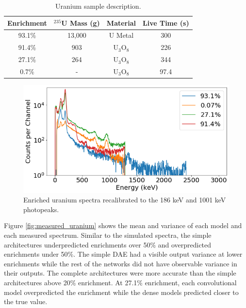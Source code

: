 \begin{table}[H]
\centering
\caption{Uranium sample description.}
\label{table:default_sim_params_uranium}
\begin{tabular}{cccc}
\hline
Enrichment & $^{235}$U Mass (g) & Material & Live Time (s)   \\ \hline
93.1\% & 13,000 & U Metal & 300 \\
91.4\% & 903 & U$_{3}$O$_{8}$ &  226\\
27.1\%  & 264 & U$_{3}$O$_{8}$ & 344 \\ 
0.7\% & - & U$_{3}$O$_{8}$ & 97.4 \\ \hline
\end{tabular}
\end{table}

\begin{figure}[H]
	\centering
	\includegraphics[width=0.8\linewidth]{images/measured_uranium_plots.png}
	\caption{Enriched uranium spectra recalibrated to the 186 keV and 1001 keV photopeaks.}
	\label{fig:measured_uranium_plots}
\end{figure}

Figure \ref{fig:measured_uranium} shows the mean and variance of each model and each measured spectrum. Similar to the simulated spectra, the simple architectures underpredicted enrichments over 50\% and overpredicted enrichments under 50\%. The simple DAE had a visible output variance at lower enrichments while the rest of the networks did not have observable variance in their outputs. The complete architectures were more accurate than the simple architectures above 20\% enrichment. At 27.1\% enrichment, each convolutional model overpredicted the enrichment while the dense models predicted closer to the true value. %




